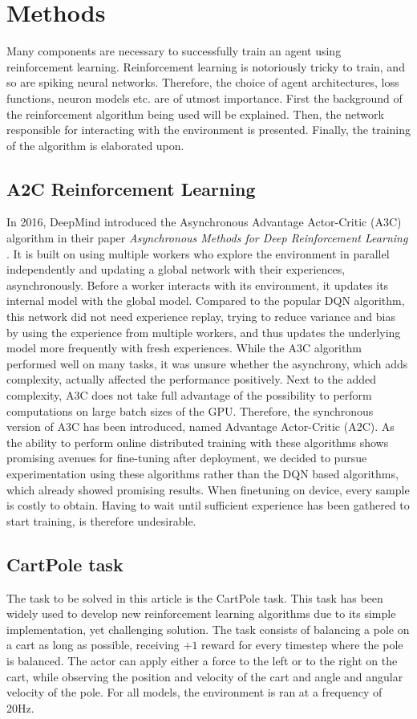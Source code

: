 \section{Methods}
\label{section:methods}
Many components are necessary to successfully train an agent using reinforcement learning. Reinforcement learning is notoriously tricky to train, and so are spiking neural networks. Therefore, the choice of agent architectures, loss functions, neuron models etc. are of utmost importance. First the background of the reinforcement algorithm being used will be explained. Then, the network responsible for interacting with the environment is presented. Finally, the training of the algorithm is elaborated upon.

\subsection{A2C Reinforcement Learning}
In 2016, DeepMind introduced the Asynchronous Advantage Actor-Critic (A3C) algorithm in their paper \textit{Asynchronous Methods for Deep Reinforcement Learning} \cite{A3C}. It is built on using multiple workers who explore the environment in parallel independently and updating a global network with their experiences, asynchronously. Before a worker interacts with its environment, it updates its internal model with the global model. Compared to the popular DQN algorithm, this network did not need experience replay, trying to reduce variance and bias by using the experience from multiple workers, and thus updates the underlying model more frequently with fresh experiences. While the A3C algorithm performed well on many tasks, it was unsure whether the asynchrony, which adds complexity, actually affected the performance positively. Next to the added complexity, A3C does not take full advantage of the possibility to perform computations on large batch sizes of the GPU. Therefore, the synchronous version of A3C has been introduced, named Advantage Actor-Critic (A2C). As the ability to perform online distributed training with these algorithms shows promising avenues for fine-tuning after deployment, we decided to pursue experimentation using these algorithms rather than the DQN based algorithms, which already showed promising results. When finetuning on device, every sample is costly to obtain. Having to wait until sufficient experience has been gathered to start training, is therefore undesirable.
\\
\subsection{CartPole task}
The task to be solved in this article is the CartPole task. This task has been widely used to develop new reinforcement learning algorithms due to its simple implementation, yet challenging solution. The task consists of balancing a pole on a cart as long as possible, receiving $+1$ reward for every timestep where the pole is balanced. The actor can apply either a force to the left or to the right on the cart, while observing the position and velocity of the cart and angle and angular velocity of the pole. For all models, the environment is ran at a frequency of 20Hz. 
